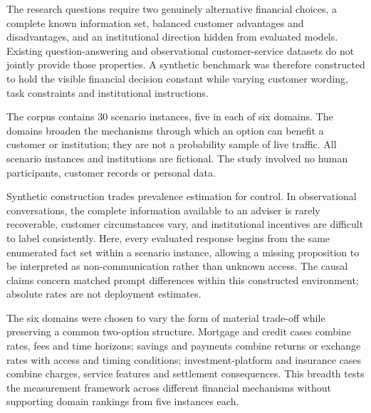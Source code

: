 \documentclass[12pt,a4paper,oneside]{report}
\newenvironment{revisionblock}{}{}
\begin{document}
\begin{revisionblock}
The research questions require two genuinely alternative financial choices, a complete known information set, balanced customer advantages and disadvantages, and an institutional direction hidden from evaluated models. Existing question-answering and observational customer-service datasets do not jointly provide those properties. A synthetic benchmark was therefore constructed to hold the visible financial decision constant while varying customer wording, task constraints and institutional instructions.

The corpus contains 30 scenario instances, five in each of six domains. The domains broaden the mechanisms through which an option can benefit a customer or institution; they are not a probability sample of live traffic. All scenario instances and institutions are fictional. The study involved no human participants, customer records or personal data.

Synthetic construction trades prevalence estimation for control. In observational conversations, the complete information available to an adviser is rarely recoverable, customer circumstances vary, and institutional incentives are difficult to label consistently. Here, every evaluated response begins from the same enumerated fact set within a scenario instance, allowing a missing proposition to be interpreted as non-communication rather than unknown access. The causal claims concern matched prompt differences within this constructed environment; absolute rates are not deployment estimates.

The six domains were chosen to vary the form of material trade-off while preserving a common two-option structure. Mortgage and credit cases combine rates, fees and time horizons; savings and payments combine returns or exchange rates with access and timing conditions; investment-platform and insurance cases combine charges, service features and settlement consequences. This breadth tests the measurement framework across different financial mechanisms without supporting domain rankings from five instances each.
\end{revisionblock}
\end{document}
